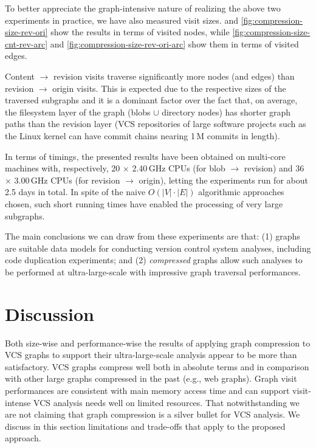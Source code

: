 \smallskip

To better appreciate the graph-intensive nature of realizing the above two
experiments in practice, we have also measured visit sizes.
 and \cref{fig:compression-size-rev-ori}
show the results in terms of visited nodes, while
\cref{fig:compression-size-cnt-rev-arc} and
\cref{fig:compression-size-rev-ori-arc} show them in terms of visited edges.

Content $\to$ revision visits traverse significantly more nodes (and edges)
than revision $\to$ origin visits. This is expected due to the respective sizes
of the traversed subgraphs and it is a dominant factor over the fact that, on
average, the filesystem layer of the graph (blobs $\cup$ directory nodes) has
shorter graph paths than the revision layer (VCS repositories of large software
projects such as the Linux kernel can have commit chains nearing 1\,M commits
in length).

\smallskip

In terms of timings, the presented results have been obtained on multi-core
machines with, respectively, 20 $\times$ 2.40\,GHz CPUs (for
blob $\to$ revision) and 36 $\times$ 3.00\,GHz CPUs (for revision $\to$ origin),
letting the experiments run for about 2.5 days in total. In spite of the naive
$O(|V|\cdot |E|)$ algorithmic approaches chosen, such short running times have
enabled the processing of very large subgraphs.

\smallskip

The main conclusions we can draw from these experiments are that: (1) graphs
are suitable data models for conducting version control system analyses,
including code duplication experiments; and (2) \emph{compressed} graphs allow
such analyses to be performed at ultra-large-scale with impressive graph
traversal performances.

\section{Discussion}%
\label{sec:compression-discussion}

Both size-wise and performance-wise the results of applying graph compression
to VCS graphs to support their ultra-large-scale analysis appear to be more
than satisfactory. VCS graphs compress well both in absolute terms and in
comparison with other large graphs compressed in the past (e.g., web graphs).
Graph visit performances are consistent with main memory access time and can
support visit-intense VCS analysis needs well on limited resources.
%
That notwithstanding we are not claiming that graph compression is a silver
bullet for VCS analysis. We discuss in this section limitations and trade-offs
that apply to the proposed approach.


